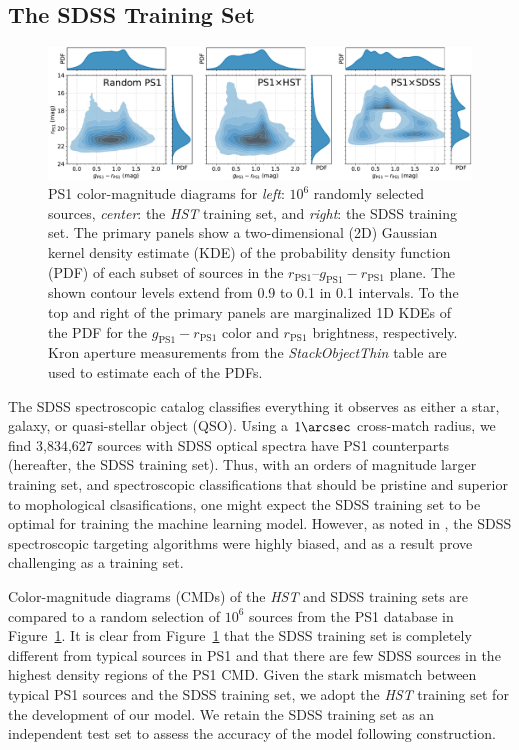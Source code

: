 \documentclass[twocolumn, dvipdfmx]{aastex62}
\begin{document}
\subsection{The SDSS Training Set}\label{sec:sdss}

\begin{figure}[htb]
 \centering
  \includegraphics[width=7.2in]{./Figures/ColorMagDiagram.pdf}
  \caption{ PS1 color-magnitude diagrams for \textit{left}: $10^6$ randomly
  selected sources, \textit{center}: the \textit{HST} training set, and
  \textit{right}: the SDSS training set. The primary panels show a
  two-dimensional (2D) Gaussian kernel density estimate (KDE) of the
  probability density function (PDF) of each subset of sources in the
  $r_\mathrm{PS1}$--$g_\mathrm{PS1} - r_\mathrm{PS1}$ plane. The shown
  contour levels extend from 0.9 to 0.1 in 0.1 intervals. To the top and
  right of the primary panels are marginalized 1D KDEs of the PDF for the
  $g_\mathrm{PS1} - r_\mathrm{PS1}$ color and $r_\mathrm{PS1}$ brightness,
  respectively. Kron aperture measurements from the \textit{StackObjectThin}
  table are used to estimate each of the PDFs. }
  \label{fig:cmd}
\end{figure}

The SDSS spectroscopic catalog classifies everything it observes as either a
star, galaxy, or quasi-stellar object (QSO). Using a $1\arcsec$ cross-match
radius, we find 3,834,627 sources with SDSS optical spectra have PS1
counterparts (hereafter, the SDSS training set). Thus, with an orders of
magnitude larger training set, and spectroscopic classifications that should
be pristine and superior to mophological clsasifications, one might expect
the SDSS training set to be optimal for training the machine learning model.
However, as noted in \citep{Miller17}, the SDSS spectroscopic targeting
algorithms were highly biased, and as a result prove challenging as a
training set.

Color-magnitude diagrams (CMDs) of the \textit{HST} and SDSS training sets
are compared to a random selection of $10^6$ sources from the PS1 database in
Figure~\ref{fig:cmd}. It is clear from Figure~\ref{fig:cmd} that the SDSS
training set is completely different from typical sources in PS1 and that
there are few SDSS sources in the highest density regions of the PS1 CMD.
Given the stark mismatch between typical PS1 sources and the SDSS training
set, we adopt the \textit{HST} training set for the development of our model.
We retain the SDSS training set as an independent test set to assess the
accuracy of the model following construction.
\end{document}
